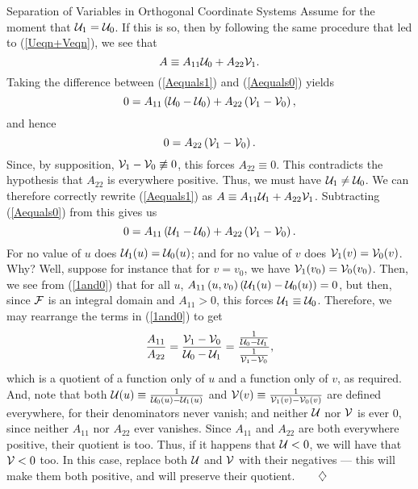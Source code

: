 \begin{section}{Separation of Variables in Orthogonal Coordinate Systems}
Assume for the moment that $\mathcal{U}_1 = \mathcal{U}_0$.  If this is so, then by following the same procedure that led to (\ref{Ueqn+Veqn}), we see that
\begin{equation}
\label{Aequals1}
A \equiv A_{11} \mathcal{U}_0 + A_{22} \mathcal{V}_1.
\end{equation}
Taking the difference between (\ref{Aequals1}) and (\ref{Aequals0}) yields
\[
0 = A_{11}\left( \mathcal{U}_0 - \mathcal{U}_0 \right) + A_{22}\left( \mathcal{V}_1 - \mathcal{V}_0 \right),
\]
and hence
\[
0 = A_{22}\left( \mathcal{V}_1 - \mathcal{V}_0 \right).
\]
Since, by supposition, $\mathcal{V}_1 - \mathcal{V}_0 \not\equiv 0$, this forces $A_{22} \equiv 0$.  \contr  This contradicts the hypothesis that $A_{22}$ is everywhere positive.  Thus, we must have $\mathcal{U}_1 \not= \mathcal{U}_0$.  We can therefore correctly rewrite (\ref{Aequals1}) as $A \equiv A_{11} \mathcal{U}_1 + A_{22}\mathcal{V}_1$.  Subtracting (\ref{Aequals0}) from this gives us
\begin{equation}
\label{1and0}
0 = A_{11}\left( \mathcal{U}_1 - \mathcal{U}_0 \right) + A_{22}\left( \mathcal{V}_1 - \mathcal{V}_0 \right).
\end{equation}
For no value of $u$ does $\mathcal{U}_1(u) = \mathcal{U}_0(u)$; and for no value of $v$ does $\mathcal{V}_1(v) = \mathcal{V}_0(v)$.  Why?  Well, suppose for instance that for $v = v_0$, we have $\mathcal{V}_1(v_0) = \mathcal{V}_0(v_0)$.  Then, we see from (\ref{1and0}) that for all $u$, $A_{11}\left( u,v_0 \right) \left( \mathcal{U}_1(u) - \mathcal{U}_0(u) \right) = 0$, but then, since $\mathcal{F}$ is an integral domain and $A_{11} > 0$, this forces $\mathcal{U}_1 \equiv \mathcal{U}_0$. \contr  Therefore, we may rearrange the terms in (\ref{1and0}) to get
\begin{equation}
\label{ratioA11A22}
\frac{A_{11}}{A_{22}} = \frac{\mathcal{V}_1 - \mathcal{V}_0}{\mathcal{U}_0 - \mathcal{U}_1} = \frac{\frac{1}{\mathcal{U}_0 - \mathcal{U}_1}}{\frac{1}{\mathcal{V}_1 - \mathcal{V}_0}},
\end{equation}
which is a quotient of a function only of $u$ and a function only of $v$, as required.  And, note that  both $\mathcal{U}(u) \equiv \frac{1}{\mathcal{U}_0(u) - \mathcal{U}_1(u)}$ and $\mathcal{V}(v) \equiv \frac{1}{\mathcal{V}_1(v) - \mathcal{V}_0(v)}$ are defined everywhere, for their denominators never vanish; and  neither $\mathcal{U}$ nor $\mathcal{V}$ is ever $0$, since neither $A_{11}$ nor $A_{22}$ ever vanishes.  Since $A_{11}$ and $A_{22}$ are both everywhere positive, their quotient is too.  Thus, if it happens that $\mathcal{U} < 0$, we will have that $\mathcal{V} < 0 $ too.  In this case, replace both $\mathcal{U}$ and $\mathcal{V}$ with their negatives --- this will make them both positive, and will preserve their quotient.$\qquad \diamondsuit$


\end{section}
